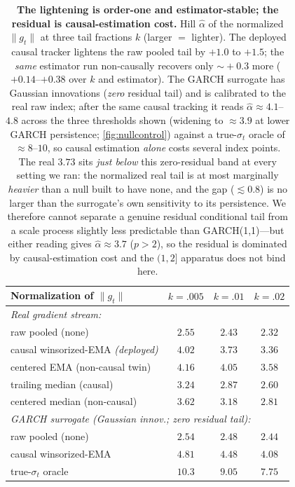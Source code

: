 \documentclass{article}
\newcommand{\norm}[1]{\lVert #1 \rVert}
\newcommand{\gt}{g_t}
\begin{document}
\begin{table}[t]
\caption{\textbf{The lightening is order-one and estimator-stable; the residual is
causal-estimation cost.} Hill $\hat\alpha$ of the normalized $\norm{\gt}$ at three tail
fractions $k$ (larger $=$ lighter). The deployed causal tracker lightens the raw pooled tail
by $+1.0$ to $+1.5$; the \emph{same} estimator run non-causally recovers only $\sim\!+0.3$
more ($+0.14$--$+0.38$ over $k$ and estimator). The GARCH surrogate has Gaussian innovations
(\emph{zero} residual tail) and is calibrated to the real raw index; after the same causal
tracking it reads $\hat\alpha\approx4.1$--$4.8$ across the three thresholds shown (widening to
$\approx3.9$ at lower GARCH persistence; \cref{fig:nullcontrol}) against a true-$\sigma_t$
oracle of $\approx8$--$10$, so causal estimation \emph{alone} costs
several index points. The real $3.73$ sits \emph{just below} this zero-residual band at every
setting we ran: the normalized real tail is at most marginally \emph{heavier} than a null
built to have none, and the gap ($\lesssim0.8$) is no larger than the surrogate's own
sensitivity to its persistence. We therefore cannot separate a genuine residual conditional
tail from a scale process slightly less predictable than GARCH(1,1)---but either reading
gives $\hat\alpha\approx3.7$ ($p>2$), so the residual is dominated by causal-estimation cost
and the $(1,2]$ apparatus does not bind here.}
\label{tab:residual}
\centering
\begin{small}
\setlength{\tabcolsep}{5pt}
\begin{tabular}{lccc}
\toprule
Normalization of $\norm{\gt}$ & $k{=}.005$ & $k{=}.01$ & $k{=}.02$ \\
\midrule
\multicolumn{4}{l}{\emph{Real gradient stream:}}\\
raw pooled (none)                        & $2.55$ & $2.43$ & $2.32$ \\
causal winsorized-EMA \emph{(deployed)}  & $4.02$ & $3.73$ & $3.36$ \\
\quad centered EMA (non-causal twin)     & $4.16$ & $4.05$ & $3.58$ \\
trailing median (causal)                 & $3.24$ & $2.87$ & $2.60$ \\
\quad centered median (non-causal)       & $3.62$ & $3.18$ & $2.81$ \\
\midrule
\multicolumn{4}{l}{\emph{GARCH surrogate (Gaussian innov.; zero residual tail):}}\\
raw pooled (none)                        & $2.54$ & $2.48$ & $2.44$ \\
causal winsorized-EMA                    & $4.81$ & $4.48$ & $4.08$ \\
\quad true-$\sigma_t$ oracle             & $10.3$ & $9.05$ & $7.75$ \\
\bottomrule
\end{tabular}
\end{small}
\end{table}
\end{document}
